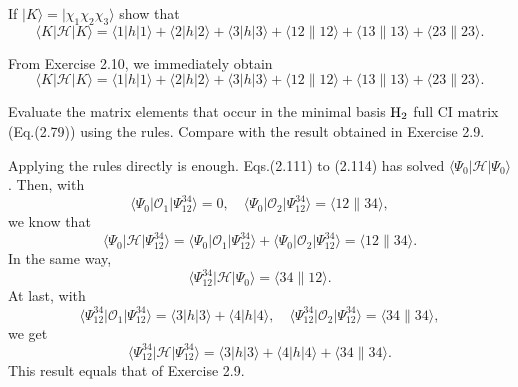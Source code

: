 \documentclass[a4paper]{book}
\newcommand\lr[2]{\langle#1\|#2\rangle}
\begin{document}
	\begin{exercise}
	If $|K\rangle = |\chi_1 \chi_2 \chi_3 \rangle$ show that
	\[
		\langle K | \mathscr{H} | K \rangle = \langle 1 | h | 1 \rangle + \langle 2 | h | 2 \rangle + \langle 3 | h | 3 \rangle + \lr{12}{12} + \lr{13}{13} + \lr{23}{23}.
	\]
	\end{exercise}
	
	\begin{solution}
	From Exercise 2.10, we immediately obtain
	\begin{equation}
		\langle K | \mathscr{H} | K \rangle = \langle 1 | h | 1 \rangle + \langle 2 | h | 2 \rangle + \langle 3 | h | 3 \rangle + \lr{12}{12} + \lr{13}{13} + \lr{23}{23}.
	\end{equation}
	\end{solution}
	
	\begin{exercise}
	Evaluate the matrix elements that occur in the minimal basis $\ce{H2}$ full CI matrix (Eq.(2.79)) using the rules. Compare with the result obtained in Exercise 2.9.
	\end{exercise}
	
	\begin{solution}
	Applying the rules directly is enough. Eqs.(2.111) to (2.114) has solved $\langle \Psi_0 | \mathscr{H} | \Psi_0 \rangle$. Then, with
	\[
		\langle \Psi_0 | \mathscr{O}_1 | \Psi^{34}_{12} \rangle = 0 , \quad \langle \Psi_0 | \mathscr{O}_2 | \Psi^{34}_{12} \rangle = \lr{12}{34},
	\]
	we know that
	\begin{equation}
		\langle \Psi_0 | \mathscr{H} | \Psi^{34}_{12} \rangle = \langle \Psi_0 | \mathscr{O}_1 | \Psi^{34}_{12} \rangle + \langle \Psi_0 | \mathscr{O}_2 | \Psi^{34}_{12} \rangle = \lr{12}{34}.
	\end{equation}
	In the same way,
	\begin{equation}
		\langle \Psi^{34}_{12} | \mathscr{H} | \Psi_0 \rangle = \lr{34}{12}.
	\end{equation}
	At last, with
	\[
		\langle \Psi^{34}_{12} | \mathscr{O}_1 | \Psi^{34}_{12} \rangle = \langle 3 | h | 3 \rangle + \langle 4 | h | 4 \rangle, \quad \langle \Psi^{34}_{12} | \mathscr{O}_2 | \Psi^{34}_{12} \rangle = \lr{34}{34},
	\]
	we get
	\begin{equation}
		\langle \Psi^{34}_{12} | \mathscr{H} | \Psi^{34}_{12} \rangle = \langle 3 | h | 3 \rangle + \langle 4 | h | 4 \rangle + \lr{34}{34}.
	\end{equation}
	This result equals that of Exercise 2.9.
	\end{solution}
	
\end{document}
